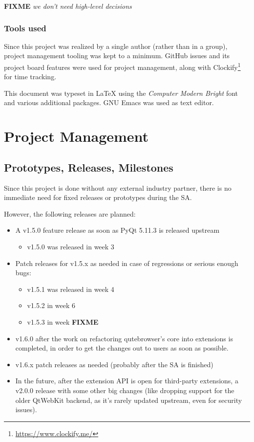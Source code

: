 \documentclass[a4paper,parskip=full]{scrreprt}
\newcommand{\fixme}[1]{\textbf{FIXME} \emph{#1}}
\begin{document}
\fixme{we don't need high-level decisions}

\subsection{Tools used}
Since this project was realized by a single author (rather than in a group),
project management tooling was kept to a minimum. GitHub issues and its project
board features were used for project management, along with
Clockify\footnote{\url{https://www.clockify.me/}} for time tracking.

This document was typeset in \LaTeX{} using the \emph{Computer Modern Bright}
font and various additional packages. GNU Emacs was used as text editor.

\chapter{Project Management}
\label{ch:projectman}

\section{Prototypes, Releases, Milestones}
Since this project is done without any external industry partner, there is no
immediate need for fixed releases or prototypes during the SA.

However, the following releases are planned:

\begin{itemize}
  \item A v1.5.0 feature release as soon as PyQt 5.11.3 is released upstream
    \begin{itemize}
      \item v1.5.0 was released in week 3
    \end{itemize}
  \item Patch releases for v1.5.x as needed in case of regressions or serious
    enough bugs:
    \begin{itemize}
      \item v1.5.1 was released in week 4
      \item v1.5.2 in week 6
      \item v1.5.3 in week \fixme{}
    \end{itemize}
  \item v1.6.0 after the work on refactoring qutebrowser's core into extensions
    is completed, in order to get the changes out to users as soon as possible.
  \item v1.6.x patch releases as needed (probably after the SA is finished)
  \item In the future, after the extension API is open for third-party
    extensions, a v2.0.0 release with some other big changes (like dropping support
    for the older QtWebKit backend, as it's rarely updated upstream, even for
    security issues).
\end{itemize}
\end{document}
